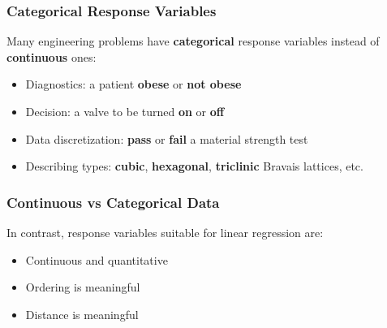 \documentclass[10pt,aspectratio=169]{beamer}
\begin{document}
\begin{frame}
  \frametitle{Categorical Response Variables}

  Many engineering problems
  have \textbf{categorical} response variables instead of
  \textbf{continuous} ones:

  \begin{itemize}
    \item Diagnostics: 	a patient \textbf{obese} or \textbf{not obese}
\item Decision:      	a valve to be turned \textbf{on} or \textbf{off}
\item Data discretization:  \textbf{pass} or \textbf{fail} a material strength test
\item Describing types: \textbf{cubic}, \textbf{hexagonal},
  \textbf{triclinic} Bravais lattices, etc.

\end{itemize}

\vspace{2em}

\end{frame}

\begin{frame}
  \frametitle{Continuous vs Categorical Data}
  In contrast, response variables suitable for linear regression are:
\begin{itemize}
\item Continuous and quantitative
\item Ordering is meaningful
\item Distance is meaningful
\end{itemize}

\end{frame}
\end{document}
